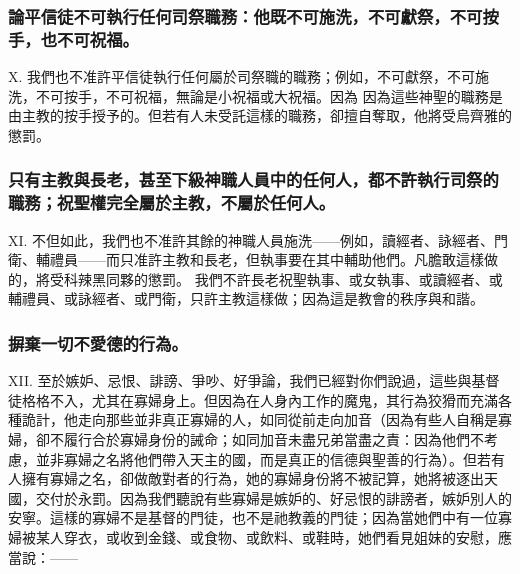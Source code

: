 \subsubsection{論平信徒不可執行任何司祭職務：他既不可施洗，不可獻祭，不可按手，也不可祝福。}

X. 我們也不准許平信徒執行任何屬於司祭職的職務；例如，不可獻祭，不可施洗，不可按手，不可祝福，無論是小祝福或大祝福。因為 因為這些神聖的職務是由主教的按手授予的。但若有人未受託這樣的職務，卻擅自奪取，他將受烏齊雅的懲罰。\par


\subsubsection{只有主教與長老，甚至下級神職人員中的任何人，都不許執行司祭的職務；祝聖權完全屬於主教，不屬於任何人。}

XI. 不但如此，我們也不准許其餘的神職人員施洗——例如，讀經者、詠經者、門衛、輔禮員——而只准許主教和長老，但執事要在其中輔助他們。凡膽敢這樣做的，將受科辣黑同夥的懲罰。 我們不許長老祝聖執事、或女執事、或讀經者、或輔禮員、或詠經者、或門衛，只許主教這樣做；因為這是教會的秩序與和諧。\par


\subsubsection{摒棄一切不愛德的行為。}

XII. 至於嫉妒、忌恨、誹謗、爭吵、好爭論，我們已經對你們說過，這些與基督徒格格不入，尤其在寡婦身上。但因為在人身內工作的魔鬼，其行為狡猾而充滿各種詭計，他走向那些並非真正寡婦的人，如同從前走向加音（因為有些人自稱是寡婦，卻不履行合於寡婦身份的誡命；如同加音未盡兄弟當盡之責：因為他們不考慮，並非寡婦之名將他們帶入天主的國，而是真正的信德與聖善的行為）。但若有人擁有寡婦之名，卻做敵對者的行為，她的寡婦身份將不被記算，她將被逐出天國，交付於永罰。因為我們聽說有些寡婦是嫉妒的、好忌恨的誹謗者，嫉妒別人的安寧。這樣的寡婦不是基督的門徒，也不是祂教義的門徒；因為當她們中有一位寡婦被某人穿衣，或收到金錢、或食物、或飲料、或鞋時，她們看見姐妹的安慰，應當說：——\par

